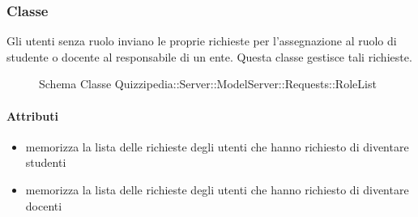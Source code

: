 \subsubsection{Classe }
Gli utenti senza ruolo inviano le proprie richieste per l'assegnazione al ruolo di studente o docente al responsabile di un ente. Questa classe gestisce tali richieste.
\begin{figure}[H]
\centering
\noindent{}
\caption[Schema Classe RoleList]{Schema Classe Quizzipedia::Server::ModelServer::Requests::RoleList}
\end{figure}
\paragraph{Attributi}
\begin{itemize}
\item {}
\newline
memorizza la lista delle richieste degli utenti che hanno richiesto di diventare studenti
\item {}
\newline
memorizza la lista delle richieste degli utenti che hanno richiesto di diventare docenti
\end{itemize}
